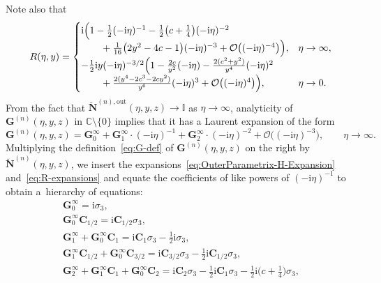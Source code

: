 Note also that
\begin{gather}
 R(\eta,y) =\begin{cases}
\mathrm{i} \Bigl(1-\tfrac{1}{2}(-\mathrm{i}\eta)^{-1} -\tfrac{1}{2}\bigl(c+\tfrac{1}{4}\bigr)(-\mathrm{i}\eta)^{-2} &\\
\qquad{} + \tfrac{1}{16}\bigl(2y^2-4c-1\bigr)(-\mathrm{i}\eta)^{-3} + \mathcal{O}\bigl((-\mathrm{i}\eta)^{-4}\bigr)\Bigr), &
\eta\to\infty, \\
-\tfrac{1}{2}\mathrm{i} y (-\mathrm{i}\eta)^{-3/2}\Bigl(1-\frac{2c}{y^2}(-\mathrm{i}\eta) -\frac{2(c^2+y^2)}{y^4}(-\mathrm{i}\eta)^2 &\\
\qquad{} +\frac{2(y^4-2c^3-2cy^2)}{y^6}(-\mathrm{i}\eta)^3+\mathcal{O}\bigl((-\mathrm{i}\eta)^{4}\bigr)\Bigr), &
\eta\to 0.
\end{cases}
\label{eq:R-expansions}
\end{gather}
From the fact that $\breve{\mathbf{N}}^{(n),\mathrm{out}}(\eta,y,z)\to\mathbb{I}$ as $\eta\to\infty$, analyticity of $\mathbf{G}^{(n)}(\eta,y,z)$ in $\mathbb{C}\setminus\{0\}$ implies that it has a Laurent expansion of the form
\begin{equation*}
\mathbf{G}^{(n)}(\eta,y,z)= \mathbf{G}^\infty_0 + \mathbf{G}^\infty_1\cdot (-\mathrm{i}\eta)^{-1} + \mathbf{G}^\infty_2\cdot(-\mathrm{i}\eta)^{-2} + \mathcal{O}\bigl((-\mathrm{i}\eta)^{-3}\bigr),\qquad\eta\to\infty.
\end{equation*}
Multiplying the definition~\eqref{eq:G-def} of $\mathbf{G}^{(n)}(\eta,y,z)$ on the right by $\breve{\mathbf{N}}^{(n)}(\eta,y,z)$, we insert the expansions~\eqref{eq:OuterParametrix-H-Expansion} and~\eqref{eq:R-expansions} and equate the coefficients of like powers of $(-\mathrm{i}\eta)^{-1}$ to obtain a~hierarchy of equations:
\begin{gather*}
\mathbf{G}^\infty_0=\mathrm{i}\sigma_3,
\\
\mathbf{G}^\infty_0\mathbf{C}_{1/2} = \mathrm{i}\mathbf{C}_{1/2}\sigma_3,
\\
\mathbf{G}^\infty_1+\mathbf{G}^\infty_0\mathbf{C}_1 = \mathrm{i}\mathbf{C}_1\sigma_3-\tfrac{1}{2}\mathrm{i}\sigma_3,
\\
\mathbf{G}^\infty_1\mathbf{C}_{1/2} +\mathbf{G}^\infty_0\mathbf{C}_{3/2}=\mathrm{i}\mathbf{C}_{3/2}\sigma_3-\tfrac{1}{2}\mathrm{i}\mathbf{C}_{1/2}\sigma_3,
\\
\mathbf{G}^\infty_2 + \mathbf{G}^\infty_1\mathbf{C}_1 + \mathbf{G}^\infty_0\mathbf{C}_2 = \mathrm{i}\mathbf{C}_2\sigma_3 -\tfrac{1}{2}\mathrm{i}\mathbf{C}_1\sigma_3-\tfrac{1}{2}\mathrm{i} \bigl(c+\tfrac{1}{4}\bigr)\sigma_3,
\end{gather*}
